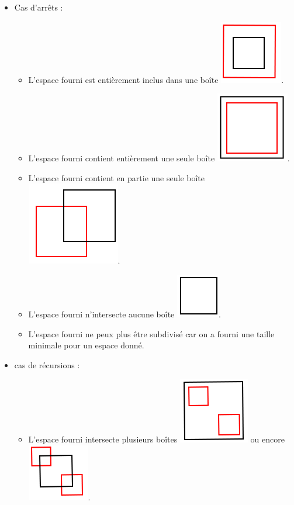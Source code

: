 \begin{itemize}
\item Cas d'arrêts : 
\begin{itemize}
\item L'espace fourni est entièrement inclus dans une boîte \includegraphics[scale=0.20]{img/QT1}.
\item L'espace fourni contient entièrement une seule boîte \includegraphics[scale=0.20]{img/QT2}.
\item L'espace fourni contient en partie une seule boîte \includegraphics[scale=0.20]{img/QT3}.
\item L'espace fourni n'intersecte aucune boîte \includegraphics[scale=0.30]{img/QT6}.
\item L'espace fourni ne peux plus être subdivisé car on a fourni une taille minimale pour un espace donné.
\end{itemize}
\item cas de récursions :
\begin{itemize}
\item L'espace fourni intersecte plusieurs boîtes \includegraphics[scale=0.20]{img/QT4} ou encore \includegraphics[scale=0.20]{img/QT5}.
\end{itemize}
\end{itemize}

